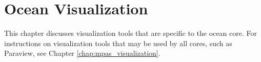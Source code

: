 \chapter{Ocean Visualization}
\label{chap:ocean_visualization}

This chapter discusses visualization tools that are specific to the ocean core.  For instructions on visualization tools that may be used by all cores, such as Paraview, see Chapter \ref{chap:mpas_visualization}.
